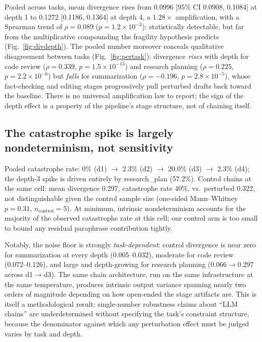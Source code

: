 \documentclass[11pt]{article}
\begin{document}
Pooled across tasks, mean divergence rises from 0.0996 [95\% CI 0.0908,
0.1084] at depth 1 to 0.1272 [0.1186, 0.1364] at depth 4, a $1.28\times$
amplification, with a Spearman trend of $\rho = 0.089$
($p = 1.2\times10^{-3}$): statistically detectable, but far from the
multiplicative compounding the fragility hypothesis predicts
(Fig.~\ref{fig:divdepth}). The pooled number moreover conceals qualitative
disagreement between tasks (Fig.~\ref{fig:pertask}): divergence
\emph{rises} with depth for code review ($\rho = 0.339$,
$p = 1.5\times10^{-13}$) and research planning ($\rho = 0.225$,
$p = 2.2\times10^{-6}$) but \emph{falls} for summarization
($\rho = -0.196$, $p = 2.8\times10^{-5}$), whose fact-checking and editing
stages progressively pull perturbed drafts back toward the baseline. There
is no universal amplification law to report; the sign of the depth effect is
a property of the pipeline's stage structure, not of chaining itself.

\subsection{The catastrophe spike is largely nondeterminism, not
sensitivity}

Pooled catastrophe rate: 0\% (d1) $\to$ 2.3\% (d2) $\to$ 20.0\% (d3) $\to$
2.3\% (d4); the depth-3 spike is driven entirely by research\_plan (57.2\%).
Control chains at the same cell: mean divergence 0.297, catastrophe rate
40\%, vs.\ perturbed 0.322, not distinguishable given the control sample
size (one-sided Mann--Whitney $p = 0.31$, $n_{\mathrm{control}} = 5$). At
minimum, intrinsic nondeterminism accounts for the majority of the observed
catastrophe rate at this cell; our control arm is too small to bound any
residual paraphrase contribution tightly.

Notably, the noise floor is strongly \emph{task-dependent}: control
divergence is near zero for summarization at every depth (0.005--0.032),
moderate for code review (0.072--0.126), and large and depth-growing for
research planning ($0.066 \to 0.297$ across d1$\to$d3). The same chain
architecture, run on the same infrastructure at the same temperature,
produces intrinsic output variance spanning nearly two orders of magnitude
depending on how open-ended the stage artifacts are. This is itself a
methodological result: single-number robustness claims about ``LLM chains''
are underdetermined without specifying the task's constraint structure,
because the denominator against which any perturbation effect must be
judged varies by task and depth.
\end{document}
